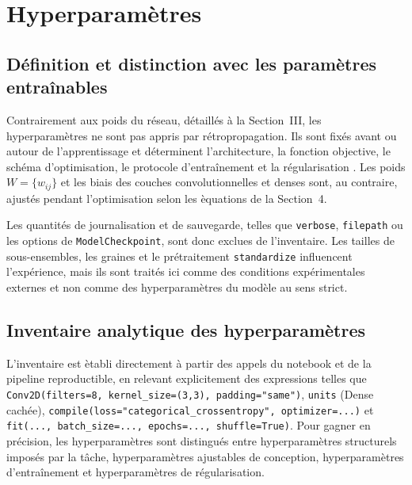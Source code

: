 \section{Hyperparam\`etres}

\subsection{D\'efinition et distinction avec les param\`etres entra\^inables}
Contrairement aux poids du r\'eseau, d\'etaill\'es \`a la Section~III, les hyperparam\`etres ne sont pas appris par r\'etropropagation. Ils sont fix\'es avant ou autour de l'apprentissage et d\'eterminent l'architecture, la fonction objective, le sch\'ema d'optimisation, le protocole d'entra\^inement et la r\'egularisation \cite{poly_chap4_classifml,manzanera_classification_apprentissage}. Les poids $W=\{w_{ij}\}$ et les biais des couches convolutionnelles et denses sont, au contraire, ajust\'es pendant l'optimisation selon les \`equations de la Section~4.

Les quantit\'es de journalisation et de sauvegarde, telles que \texttt{verbose}, \texttt{filepath} ou les options de \texttt{ModelCheckpoint}, sont donc exclues de l'inventaire. Les tailles de sous-ensembles, les graines et le pr\'etraitement \texttt{standardize} influencent l'exp\'erience, mais ils sont trait\'es ici comme des conditions exp\'erimentales externes et non comme des hyperparam\`etres du mod\`ele au sens strict.

\subsection{Inventaire analytique des hyperparam\`etres}
L'inventaire est \`etabli directement \`a partir des appels du notebook et de la pipeline reproductible, en relevant explicitement des expressions telles que \texttt{Conv2D(filters=8, kernel\_size=(3,3), padding="same")}, \texttt{units} (Dense cach\'ee), \texttt{compile(loss="categorical\_crossentropy", optimizer=...)} et \texttt{fit(..., batch\_size=..., epochs=..., shuffle=True)}. Pour gagner en pr\'ecision, les hyperparam\`etres sont distingu\'es entre hyperparam\`etres structurels impos\'es par la t\^ache, hyperparam\`etres ajustables de conception, hyperparam\`etres d'entra\^inement et hyperparam\`etres de r\'egularisation.

